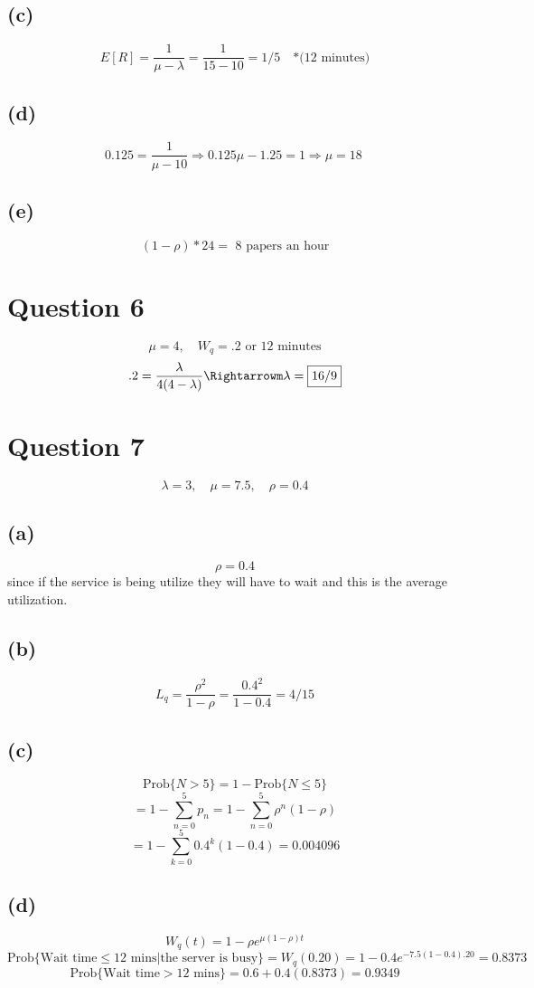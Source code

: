 \documentclass{article}
\begin{document}
\subsection*{(c)}
\[E[R]= \frac{1}{\mu - \lambda} = \frac{1}{15 - 10} = \boxed{1/5  \quad
\mbox{*(12 minutes)}}\]

\subsection*{(d)}
\[0.125 = \frac{1}{\mu - 10} \Rightarrow 0.125\mu - 1.25 = 1 \Rightarrow
\boxed{\mu = 18 }\
\]

\subsection*{(e)}
\[(1-\rho) * 24  = \boxed{\mbox{ 8 papers an hour}}\]

\section*{Question 6}
\[\mu = 4, \quad W_q = .2 \mbox{ or 12 minutes}\]
\[.2 = \frac{\lambda}{4(4-\lambda)} \Rightarrowm \lambda = \boxed{16/9} \]

\section*{Question 7}
\[ \lambda = 3, \quad \mu = 7.5, \quad \rho = 0.4 \]

\subsection*{(a)}
\[\boxed{ \rho = 0.4 }\]
since if the service is being utilize they will have to wait and this is the
average utilization. 
\subsection*{(b)}
\[L_q = \frac{\rho^2}{1-\rho} = \frac{0.4^2}{1-0.4} = \boxed{4/15}\]
\subsection*{(c)}
\[\mbox{Prob}\{N > 5\} = 1 - \mbox{Prob}\{N \leq 5\}\]
\[= 1 -\sum\limits_{n=0}^{5}p_n = 1 - \sum\limits_{n=0}^{5}{\rho^n(1 -
\rho)}\]\[ = 1 - \sum\limits_{k=0}^{5}{0.4^k(1 -
0.4)} = \boxed{0.004096} \]
\subsection*{(d)}
\[W_q(t) = 1 - \rho e^{\mu (1- \rho)t} \]
\[\mbox{Prob}\{\mbox{Wait time} \leq \mbox{12 mins} | \mbox{the server is busy}
\} = W_q(0.20) = 1 - 0.4 e^{-7.5 (1- 0.4).20} = 0.8373 \] \[\mbox{Prob}\{
\mbox{Wait time} > \mbox{12 mins} \} = 0.6 + 0.4(0.8373) = \boxed{0.9349}\]
\end{document}
